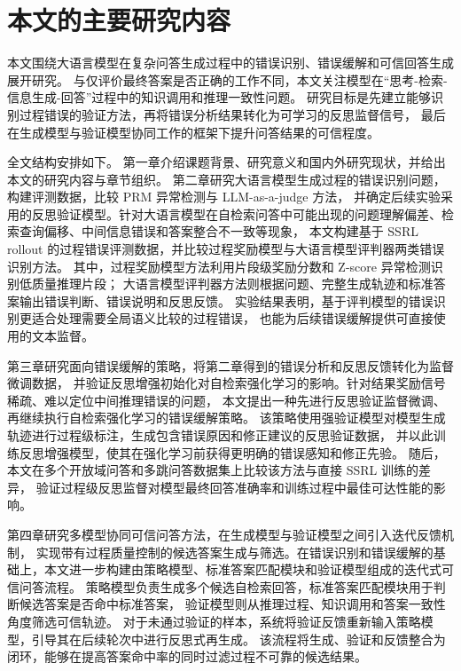 \section{本文的主要研究内容}
本文围绕大语言模型在复杂问答生成过程中的错误识别、错误缓解和可信回答生成展开研究。
与仅评价最终答案是否正确的工作不同，本文关注模型在“思考-检索-信息生成-回答”过程中的知识调用和推理一致性问题。
研究目标是先建立能够识别过程错误的验证方法，再将错误分析结果转化为可学习的反思监督信号，
最后在生成模型与验证模型协同工作的框架下提升问答结果的可信程度。



全文结构安排如下。
第一章介绍课题背景、研究意义和国内外研究现状，并给出本文的研究内容与章节组织。
第二章研究大语言模型生成过程的错误识别问题，构建评测数据，比较 PRM 异常检测与 LLM-as-a-judge 方法，
并确定后续实验采用的反思验证模型。针对大语言模型在自检索问答中可能出现的问题理解偏差、检索查询偏移、中间信息错误和答案整合不一致等现象，
本文构建基于 SSRL rollout 的过程错误评测数据，并比较过程奖励模型与大语言模型评判器两类错误识别方法。
其中，过程奖励模型方法利用片段级奖励分数和 Z-score 异常检测识别低质量推理片段；
大语言模型评判器方法则根据问题、完整生成轨迹和标准答案输出错误判断、错误说明和反思反馈。
实验结果表明，基于评判模型的错误识别更适合处理需要全局语义比较的过程错误，
也能为后续错误缓解提供可直接使用的文本监督。

第三章研究面向错误缓解的策略，将第二章得到的错误分析和反思反馈转化为监督微调数据，
并验证反思增强初始化对自检索强化学习的影响。针对结果奖励信号稀疏、难以定位中间推理错误的问题，
本文提出一种先进行反思验证监督微调、再继续执行自检索强化学习的错误缓解策略。
该策略使用强验证模型对模型生成轨迹进行过程级标注，生成包含错误原因和修正建议的反思验证数据，
并以此训练反思增强模型，使其在强化学习前获得更明确的错误感知和修正先验。
随后，本文在多个开放域问答和多跳问答数据集上比较该方法与直接 SSRL 训练的差异，
验证过程级反思监督对模型最终回答准确率和训练过程中最佳可达性能的影响。


第四章研究多模型协同可信问答方法，在生成模型与验证模型之间引入迭代反馈机制，
实现带有过程质量控制的候选答案生成与筛选。在错误识别和错误缓解的基础上，本文进一步构建由策略模型、标准答案匹配模块和验证模型组成的迭代式可信问答流程。
策略模型负责生成多个候选自检索回答，标准答案匹配模块用于判断候选答案是否命中标准答案，
验证模型则从推理过程、知识调用和答案一致性角度筛选可信轨迹。
对于未通过验证的样本，系统将验证反馈重新输入策略模型，引导其在后续轮次中进行反思式再生成。
该流程将生成、验证和反馈整合为闭环，能够在提高答案命中率的同时过滤过程不可靠的候选结果。





